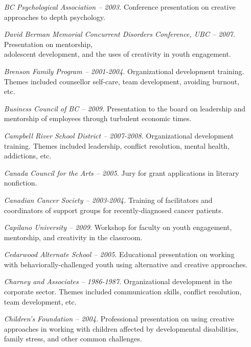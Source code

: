 \documentclass[10pt,DIV09,letterpaper,oneside,headsepline]{scrreprt}
\begin{document}
\begin{itemize}
\item [\textit{BC Psychological Association -- 2003.}]
Conference presentation on creative approaches to depth psychology.

\item [\textit{David Berman Memorial Concurrent Disorders Conference, UBC -- 2007.}]
Presentation on mentorship,\\ adolescent development, and the uses of creativity in youth engagement.

\item [\textit{Brenson Family Program -- 2001-2004.}]
Organizational development training. Themes included counsellor self-care, team development, avoiding burnout, etc.

\item [\textit{Business Council of BC -- 2009.}]
Presentation to the board on leadership and mentorship of employees through turbulent economic times.

\item [\textit{Campbell River School District -- 2007-2008.}]
Organizational development training. Themes included leadership, conflict resolution, mental health, addictions, etc.

 \item [\textit{Canada Council for the Arts -- 2005.}]
Jury for grant applications in literary nonfiction.

\item [\textit{Canadian Cancer Society -- 2003-2004.}]
Training of facilitators and coordinators of support groups for recently-diagnosed cancer patients.

\item [\textit{Capilano University -- 2009.}]
Workshop for faculty on youth engagement, mentorship, and creativity in the classroom.

\item [\textit{Cedarwood Alternate School -- 2005.}]
Educational presentation on working with behaviorally-challenged youth using alternative and creative approaches.

\item [\textit{Charney and Associates -- 1986-1987.}]
Organizational development in the corporate sector. Themes included communication skills, conflict resolution, team development, etc.

\item [\textit{Children's Foundation -- 2004.}]
Professional presentation on using creative approaches in working with children affected by developmental disabilities, family stress, and other common challenges.


\end{itemize}
\end{document}
